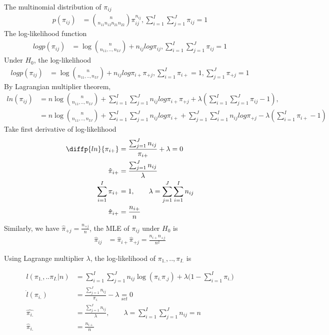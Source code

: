 \begin{itemize}
The multinomial distribution of $\pi_{ij}$
\begin{align*}
	p(\pi_{ij}) &= {n \choose n_{11} n_{12} n_{21} n_{22}} \pi_{ij}^{n_{ij}} , \sum_{i=1}^I \sum_{j=1}^J \pi_{ij} = 1
\end{align*}
The log-likelihood function
\begin{align*}
	log p(\pi_{ij}) &= \log {n \choose n_{11} ,.., n_{IJ}} +  n_{ij} log \pi_{ij} , \sum_{i=1}^I \sum_{j=1}^J \pi_{ij} = 1
\end{align*}
Under $H_0$, the log-likelihood
\begin{align*}
	log p(\pi_{ij}) &= \log {n \choose n_{11} ,.., n_{IJ}}  +  n_{ij} log \pi_{i+} \pi_{+j} , \sum_{i=1}^I \pi_{i+} = 1, \sum_{j=1}^J \pi_{+j} = 1 
\end{align*}
By Lagrangian multiplier theorem,
\begin{align*}
	ln(\pi_{ij}) &=n \log {n \choose n_{11} ,.., n_{IJ}}  +\sum_{i=1}^I \sum_{j=1}^J n_{ij} log \pi_{i+} \pi_{+j} + \lambda ( \sum_{i=1}^I \sum_{j=1}^J \pi_{ij} - 1),\\
	&= n \log {n \choose n_{11} ,.., n_{IJ}}  +\sum_{i=1}^I \sum_{j=1}^J n_{ij} log \pi_{i+} + \sum_{j=1}^J \sum_{i=1}^I n_{ij} log \pi_{+j} - \lambda ( \sum_{i=1}^I \pi_{i+} - 1)
\end{align*}
Take first derivative of log-likelihood
\begin{align*}
	\diffp{ln}{{\pi_{i+}}} &= \frac{\sum_{j=1}^J n_{ij}}{\pi_{i+}} + \lambda = 0 \\
	\hat{\pi}_{i+} &= \frac{\sum_{j=1}^J n_{ij}}{\lambda}\\
	\sum_{i=1}^I \pi_{i+} &= 1, \qquad \lambda = \sum_{j=1}^J \sum_{i=1}^I n_{ij}\\
	\hat{\pi}_{i+} &= \frac{n_{i+}}{n}
\end{align*}
Similarly, we have $\hat{\pi}_{+j} = \frac{n_{+j}}{n}$, the MLE of $\pi_{ij}$ under $H_0$ is 
\begin{align*}
	\hat{\pi}_{ij} &= \hat{\pi}_{i+} \hat{\pi}_{+j} = \frac{n_{i+} n_{+j}}{n^2}
\end{align*}

Using Lagrange multiplier $\lambda$, the log-likelihood of $\pi_{1.},.., \pi_{I.}$ is

\begin{align*}
	l(\pi_{1.},..\pi_{I.}| n) &= \sum_{i=1}^I \sum_{j=1}^J {n_{ij}} \log \left( \pi_{i.} \pi_{.j} \right) + \lambda \Big( 1- \sum_{i=1}^I \pi_{i.} \Big)\\
	\dot{l} (\pi_{i.}) &= \frac{\sum_{j=1}^J n_{ij}}{\pi_{i.}} - \lambda \underset{set}{=} 0\\
	\hat{\pi_{i.}} &= \frac{\sum_{j=1}^J n_{ij}}{\lambda}, \qquad \lambda = \sum_{i=1}^I \sum_{j=1}^J {n_{ij}} = n \\
	\hat{\pi}_{i.} &= \frac{n_{i+}}{n} 
\end{align*}



\end{itemize}
